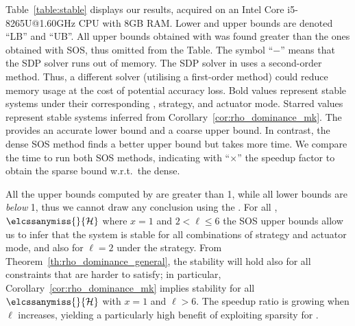 Table~\ref{table:stable} displays our results, acquired on an Intel Core i5-8265U@1.60GHz CPU with 8GB RAM.
Lower and upper bounds are denoted ``LB'' and ``UB''. 
All upper bounds obtained with  was found greater than the ones obtained with SOS, thus omitted from the Table.
The symbol ``$-$'' means that the SDP solver runs out of memory.
%
The SDP solver in  uses a second-order method.
Thus, a different solver (utilising a first-order method) could reduce memory usage at the cost of potential accuracy loss.
Bold values represent stable systems under their corresponding \ewhc{}, strategy, and actuator mode.
Starred values represent stable systems inferred from Corollary~\ref{cor:rho_dominance_mk}.
%
The  provides an accurate lower bound and a coarse upper bound.
In contrast, the dense SOS method finds a better upper bound but takes more time.
We compare the time to run both SOS methods, indicating with ``$\times$'' the speedup factor to obtain the sparse bound w.r.t.~the dense.

% 

All the upper bounds computed by  are greater than 1, while all lower bounds are \emph{below} 1, thus we cannot draw any conclusion using the .
For all \ewhc{}, $\elcssanymiss{}{\strat}$ where $x=1$ and $2 < \ell \leq 6$ the SOS upper bounds allow us to infer that the system is stable for all combinations of strategy and actuator mode, and also for $\ell=2$ under the \tS{} strategy.
From Theorem~\ref{th:rho_dominance_general}, the stability will hold also for all constraints that are harder to satisfy; in particular, Corollary~\ref{cor:rho_dominance_mk} implies stability for all $\elcssanymiss{}{\strat}$ with $x=1$ and $\ell>6$.
The speedup ratio is growing when $\ell$ increases, yielding a particularly high benefit of exploiting sparsity for \tSZ{}.
